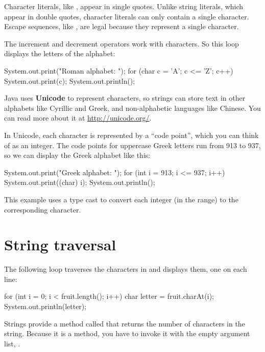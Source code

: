 Character literals, like , appear in single quotes.
Unlike string literals, which appear in double quotes, character literals can only contain a single character.
Escape sequences, like , are legal because they represent a single character.

The increment and decrement operators work with characters.
So this loop displays the letters of the alphabet:

\begin{code}
System.out.print("Roman alphabet: ");
for (char c = 'A'; c <= 'Z'; c++) {
    System.out.print(c);
}
System.out.println();
\end{code}


Java uses {\bf Unicode} to represent characters, so strings can store text in other alphabets like Cyrillic and Greek, and non-alphabetic languages like Chinese.
You can read more about it at \url{http://unicode.org/}.

In Unicode, each character is represented by a ``code point'', which you can think of as an integer.
The code points for uppercase Greek letters run from 913 to 937, so we can display the Greek alphabet like this:

\begin{code}
System.out.print("Greek alphabet: ");
for (int i = 913; i <= 937; i++) {
    System.out.print((char) i);
}
System.out.println();
\end{code}

This example uses a type cast to convert each integer (in the range) to the corresponding character.


\section{String traversal}
\label{stringtraverse}


The following loop traverses the characters in  and displays them, one on each line:

\begin{code}
for (int i = 0; i < fruit.length(); i++) {
    char letter = fruit.charAt(i);
    System.out.println(letter);
}
\end{code}


Strings provide a method called  that returns the number of characters in the string.
Because it is a method, you have to invoke it with the empty argument list, \java{()}.

